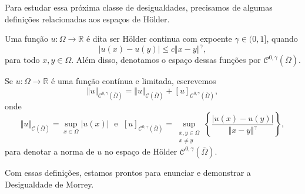 \documentclass[a4paper, 11pt]{book}
\theoremstyle{definition}
\newcommand{\bR}{\mathbb{R}}
\newcommand{\cC}{\mathcal{C}}
\begin{document}
Para estudar essa próxima classe de desigualdades, precisamos de algumas definições relacionadas aos espaços de Hölder.

\begin{dbox}
    Uma função $u : \Omega \to \bR$ é dita ser Hölder continua com expoente $\gamma \in (0,1]$, quando
    \[
        |u(x) - u(y)| \leqslant c \Vert x - y \Vert^\gamma,
    \]
    para todo $x,y \in \Omega$. Além disso, denotamos o espaço dessas funções por $\cC^{0,\gamma}(\overline\Omega)$.
\end{dbox}

\begin{dbox}
    Se $u : \Omega \to \bR$ é uma função contínua e limitada, escrevemos
    \[
        \Vert u \Vert_{\cC^{0,\gamma}(\overline\Omega)} = \Vert u \Vert_{\cC(\overline\Omega)} + [u]_{\cC^{0,\gamma}(\overline\Omega)},
    \]
    onde
    \[
        \Vert u \Vert_{\cC(\overline\Omega)} = \sup_{x \in \Omega} |u(x)| \;\text{ e }\; [u]_{\cC^{0,\gamma}(\overline\Omega)} = \sup_{\substack{x,y \in \Omega\\x \neq y}} \left\{ \frac{|u(x) - u(y)|}{\Vert x - y \Vert^\gamma} \right\},
    \]
    para denotar a norma de $u$ no espaço de Hölder $\cC^{0,\gamma}(\overline\Omega)$.
\end{dbox}

Com essas definições, estamos prontos para enunciar e demonstrar a Desigualdade de Morrey.
\end{document}
